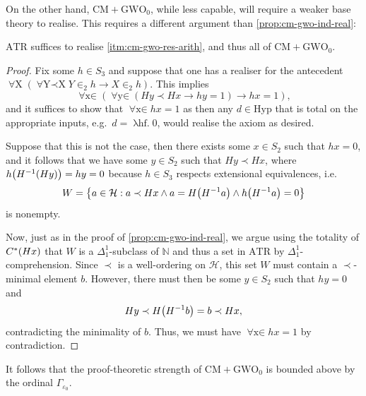 \documentclass[12pt,openany]{book}
\theoremstyle{plain}
\theoremstyle{definition}
\newcommand\opA[1]{\mathop{\forall #1}}
\newcommand\oplam[1]{\mathop{\lambda #1.}}
\newcommand\ATR{\mathrm{ATR}}
\newcommand\CM{\mathrm{CM}}
\newcommand\GWO{\mathrm{GWO}}
\newcommand\Hyp{\mathrm{Hyp}}
\begin{document}
On the other hand, $\CM + \GWO_0$, while less capable, will require a weaker base theory to realise. This requires a different argument than \autoref{prop:cm-gwo-ind-real}:
\begin{proposition}
  $\ATR$ suffices to realise \ref{itm:cm-gwo-res-arith}, and thus all of $\CM + \GWO_0$.
\end{proposition}

\begin{proof}
  Fix some $h \in S_3$ and suppose that one has a realiser for the antecedent $\opA{X} \left(\opA{Y \prec X} Y \in_2 h \rightarrow X \in_2 h\right)$. This implies
  \[\opA{x \in S_2} \left(\opA{y \in S_2} \left(Hy \prec Hx \rightarrow hy = 1\right) \rightarrow hx = 1\right),\]
  and it suffices to show that $\opA{x \in S_2} hx = 1$ as then any $d \in \Hyp$ that is total on the appropriate inputs, e.g.\ $d = \oplam{hf} 0$, would realise the axiom as desired.

  Suppose that this is not the case, then there exists some $x \in S_2$ such that $hx = 0$, and it follows that we have some $y \in S_2$ such that $Hy \prec Hx$, where
  $h \mleft(H^{-1} \mleft(Hy\mright)\mright) = hy = 0$
  because $h \in S_3$ respects extensional equivalences, i.e.
  \[W = \left\{a \in \mathcal{H} : a \prec Hx \land a = H \mleft(H^{-1} a\mright) \land h \mleft(H^{-1} a\mright) = 0\right\}\]
  is nonempty.

  Now, just as in the proof of \autoref{prop:cm-gwo-ind-real}, we argue using the totality of $C^* \mleft(Hx\mright)$ that $W$ is a $\Delta^1_1$-subclass of $\mathbb{N}$ and thus a set in $\ATR$ by $\Delta^1_1$-comprehension. Since $\prec$ is a well-ordering on $\mathcal{H}$, this set $W$ must contain a $\prec$-minimal element $b$. However, there must then be some $y \in S_2$ such that $hy = 0$ and
  \[Hy \prec H \mleft(H^{-1} b\mright) = b \prec Hx,\]
  contradicting the minimality of $b$. Thus, we must have $\opA{x \in S_2} hx = 1$ by contradiction.
\end{proof}

It follows that the proof-theoretic strength of $\CM + \GWO_0$ is bounded above by the ordinal $\Gamma_{\varepsilon_0}$.
\end{document}
